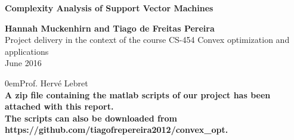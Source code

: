 \begin{titlepage}


\begin{center}
\begin{figure}[hbtp]
\begin{center}
{
	\bf {}
}
\end{center}
\end{figure}

\vspace{3cm}
{\LARGE{{\bf{Complexity Analysis of Support Vector Machines}}}}
\vspace{2cm}

{\large {\bf{Hannah Muckenhirn and Tiago de Freitas Pereira}}} \\
\vspace{2cm}
{\large Project delivery in the context of the course CS-454 Convex optimization and applications
\\
	June 2016}
\vspace{1cm}
\end{center}


{\parindent0em{Prof. Herv\'e Lebret\\}}
\textbf{A zip file containing the matlab scripts of our project has been attached with this report.} \\
\textbf{The scripts can also be downloaded from https://github.com/tiagofrepereira2012/convex\_opt.}


\end{titlepage}
